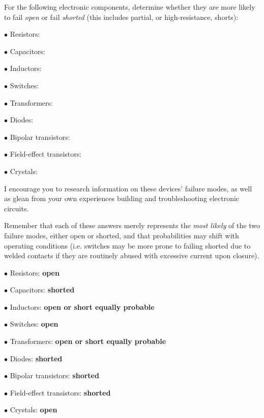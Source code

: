 

For the following electronic components, determine whether they are more likely to fail {\it open} or fail {\it shorted} (this includes partial, or high-resistance, shorts):

\medskip
\item{$\bullet$} Resistors:
\item{$\bullet$} Capacitors:
\item{$\bullet$} Inductors:
\item{$\bullet$} Switches:
\item{$\bullet$} Transformers:
\item{$\bullet$} Diodes:
\item{$\bullet$} Bipolar transistors:
\item{$\bullet$} Field-effect transistors:
\item{$\bullet$} Crystals:
\medskip

I encourage you to research information on these devices' failure modes, as well as glean from your own experiences building and troubleshooting electronic circuits.







Remember that each of these answers merely represents the {\it most likely} of the two failure modes, either open or shorted, and that probabilities may shift with operating conditions (i.e. switches may be more prone to failing shorted due to welded contacts if they are routinely abused with excessive current upon closure).

\medskip
\item{$\bullet$} Resistors: {\bf open}
\item{$\bullet$} Capacitors: {\bf shorted}
\item{$\bullet$} Inductors: {\bf open or short equally probable}
\item{$\bullet$} Switches: {\bf open}
\item{$\bullet$} Transformers: {\bf open or short equally probable}
\item{$\bullet$} Diodes: {\bf shorted}
\item{$\bullet$} Bipolar transistors: {\bf shorted}
\item{$\bullet$} Field-effect transistors: {\bf shorted}
\item{$\bullet$} Crystals: {\bf open}
\medskip

